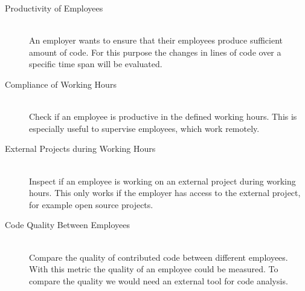 \begin{description}
    \item[Productivity of Employees] \hfill \\
        An employer wants to ensure that their employees produce sufficient amount of code.
        For this purpose the changes in lines of code over a specific time span will be evaluated.

    \item[Compliance of Working Hours] \hfill \\
        Check if an employee is productive in the defined working hours.
        This is especially useful to supervise employees, which work remotely.

    \item[External Projects during Working Hours] \hfill \\
        Inspect if an employee is working on an external project during working hours.
        This only works if the employer has access to the external project, for example open source projects.

    \item[Code Quality Between Employees] \hfill \\
        Compare the quality of contributed code between different employees.
        With this metric the quality of an employee could be measured.
        To compare the quality we would need an external tool for code analysis.
\end{description}



